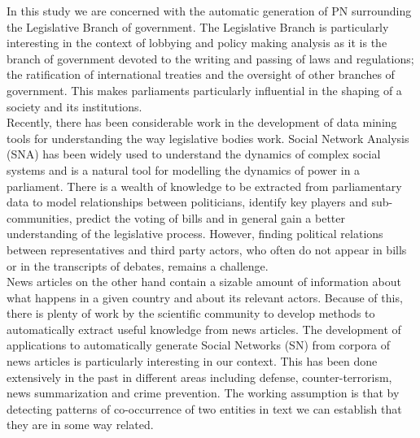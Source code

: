 In this study we are concerned with the automatic generation of PN surrounding the Legislative Branch of government. The Legislative Branch is particularly interesting in the context of lobbying and policy making analysis as it is the branch of government devoted to the writing and passing of laws and regulations; the ratification of international treaties and the oversight of other branches of government. This makes parliaments particularly influential in the shaping of a society and its institutions.\\ 

Recently, there has been considerable work in the development of data mining tools for understanding the way legislative bodies work. Social Network Analysis (SNA) has been widely used to understand the dynamics of complex social systems and is a natural tool for modelling the dynamics of power in a parliament. There is a wealth of knowledge to be extracted from parliamentary data to model relationships between politicians, identify key players and sub-communities, predict the voting of bills and in general gain a better understanding of the legislative process. However, finding political relations between representatives and third party actors, who often do not appear in bills or in the transcripts of debates, remains a challenge. \\

News articles on the other hand contain a sizable amount of information about what happens in a given country and about its relevant actors. Because of this, there is plenty of work by the scientific community to develop methods to automatically extract useful knowledge from news articles. The development of applications to automatically generate Social Networks (SN) from corpora of news articles is particularly interesting in our context. This has been done extensively in the past in different areas including defense, counter-terrorism, news summarization and crime prevention. The working assumption is that by detecting patterns of co-occurrence of two entities in text we can establish that they are in some way related.  \\

